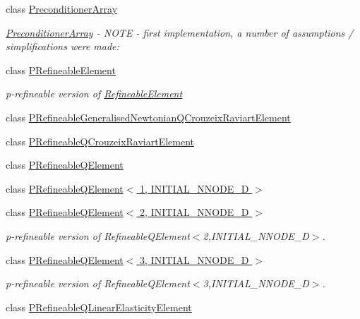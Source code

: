 \begin{DoxyCompactItemize}
class \hyperlink{classoomph_1_1PreconditionerArray}{Preconditioner\+Array}
\begin{DoxyCompactList}\small\item\em \hyperlink{classoomph_1_1PreconditionerArray}{Preconditioner\+Array} -\/ N\+O\+TE -\/ first implementation, a number of assumptions / simplifications were made\+: \end{DoxyCompactList}\item 
class \hyperlink{classoomph_1_1PRefineableElement}{P\+Refineable\+Element}
\begin{DoxyCompactList}\small\item\em p-\/refineable version of \hyperlink{classoomph_1_1RefineableElement}{Refineable\+Element} \end{DoxyCompactList}\item 
class \hyperlink{classoomph_1_1PRefineableGeneralisedNewtonianQCrouzeixRaviartElement}{P\+Refineable\+Generalised\+Newtonian\+Q\+Crouzeix\+Raviart\+Element}
\item 
class \hyperlink{classoomph_1_1PRefineableQCrouzeixRaviartElement}{P\+Refineable\+Q\+Crouzeix\+Raviart\+Element}
\item 
class \hyperlink{classoomph_1_1PRefineableQElement}{P\+Refineable\+Q\+Element}
\item 
class \hyperlink{classoomph_1_1PRefineableQElement_3_011_00_01INITIAL__NNODE__1D_01_4}{P\+Refineable\+Q\+Element$<$ 1, I\+N\+I\+T\+I\+A\+L\+\_\+\+N\+N\+O\+D\+E\+\_\+D $>$}
\item 
class \hyperlink{classoomph_1_1PRefineableQElement_3_012_00_01INITIAL__NNODE__1D_01_4}{P\+Refineable\+Q\+Element$<$ 2, I\+N\+I\+T\+I\+A\+L\+\_\+\+N\+N\+O\+D\+E\+\_\+D $>$}
\begin{DoxyCompactList}\small\item\em p-\/refineable version of Refineable\+Q\+Element$<$2,\+I\+N\+I\+T\+I\+A\+L\+\_\+\+N\+N\+O\+D\+E\+\_\+D$>$. \end{DoxyCompactList}\item 
class \hyperlink{classoomph_1_1PRefineableQElement_3_013_00_01INITIAL__NNODE__1D_01_4}{P\+Refineable\+Q\+Element$<$ 3, I\+N\+I\+T\+I\+A\+L\+\_\+\+N\+N\+O\+D\+E\+\_\+D $>$}
\begin{DoxyCompactList}\small\item\em p-\/refineable version of Refineable\+Q\+Element$<$3,\+I\+N\+I\+T\+I\+A\+L\+\_\+\+N\+N\+O\+D\+E\+\_\+D$>$. \end{DoxyCompactList}\item 
class \hyperlink{classoomph_1_1PRefineableQLinearElasticityElement}{P\+Refineable\+Q\+Linear\+Elasticity\+Element}

\end{DoxyCompactItemize}
